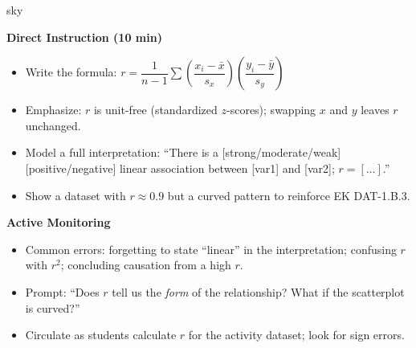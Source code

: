 \documentclass[10pt]{article}
\begin{document}
\begin{skillbox}{sky}
\begin{minipage}[t]{0.48\linewidth}
    \textbf{Direct Instruction (10 min)}
    \begin{itemize}
        \item Write the formula:
              $r = \dfrac{1}{n-1}\sum\!\left(\dfrac{x_i - \bar x}{s_x}\right)\!\left(\dfrac{y_i - \bar y}{s_y}\right)$
        \item Emphasize: $r$ is unit-free (standardized $z$-scores); swapping $x$ and $y$
              leaves $r$ unchanged.
        \item Model a full interpretation: ``There is a [strong/moderate/weak]
              [positive/negative] linear association between [var1] and [var2]; $r = [\ldots]$.''
        \item Show a dataset with $r \approx 0.9$ but a curved pattern to reinforce
              EK DAT-1.B.3.
    \end{itemize}
\end{minipage}
\hfill
\begin{minipage}[t]{0.48\linewidth}
    \textbf{Active Monitoring}
    \begin{itemize}
        \item Common errors: forgetting to state ``linear'' in the interpretation; confusing
              $r$ with $r^2$; concluding causation from a high $r$.
        \item Prompt: ``Does $r$ tell us the \emph{form} of the relationship? What if
              the scatterplot is curved?''
        \item Circulate as students calculate $r$ for the activity dataset; look for
              sign errors.
    \end{itemize}
\end{minipage}
\end{skillbox}
\end{document}
